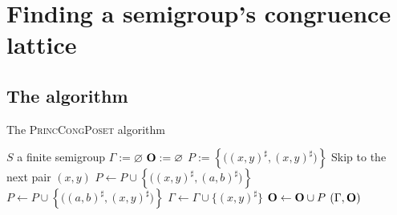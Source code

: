 \chapter{Finding a semigroup's congruence lattice}
\label{chap:lattice}

\lipsum[3]

\section{The algorithm}

\begin{algorithm}
  \caption{The \textsc{PrincCongPoset} algorithm}
  \label{alg:princ-cong-poset}
  \begin{algorithmic}[1]
    \Require $S$ a finite semigroup
      \State $\Gamma := \varnothing$
      \State $\mathbf{O} := \varnothing$
        \State $P := \left\{\big((x,y)^\sharp, (x,y)^\sharp\big)\right\}$
              \State Skip to the next pair $(x,y)$
            \Else
              \State $P \gets P \cup
                \left\{\big((x,y)^\sharp, (a,b)^\sharp\big)\right\}$
            \EndIf
              \State $P \gets P \cup
                \left\{\big((a,b)^\sharp, (x,y)^\sharp\big)\right\}$
          \EndIf
        \EndFor
        \State $\Gamma \gets \Gamma \cup \{(x,y)^\sharp\}$
        \State $\mathbf{O} \gets \mathbf{O} \cup P$
      \EndFor
      \State \Return $(\Gamma, \mathbf{O})$
    \EndProcedure
  \end{algorithmic}
\end{algorithm}

